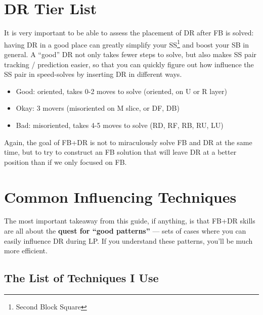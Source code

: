 \documentclass[12pt,letter]{article}
\begin{document}
\section{DR Tier List}\label{drtier}

It is very important to be able to assess the placement of DR after FB is solved: having DR in a good place can greatly simplify your SS\footnote{Second Block Square} and boost your SB in general. A ``good'' DR not only takes fewer steps to solve, but also makes SS pair tracking / prediction easier, so that you can quickly figure out how influence the SS pair in speed-solves by inserting DR in different ways.

\begin{itemize}
    \item Good: oriented, takes 0-2 moves to solve (oriented, on U or R layer)
    \item Okay: 3 movers (misoriented on M slice, or DF, DB)
    \item Bad: misoriented, takes 4-5 moves to solve (RD, RF, RB, RU, LU)
\end{itemize}

Again, the goal of FB+DR is not to miraculously solve FB and DR at the same time, but to try to construct an FB solution that will leave DR at a better position than if we only focused on FB.

\section{Common Influencing Techniques}\label{influencing}

The most important takeaway from this guide, if anything, is that FB+DR skills are all about the \textbf{quest for “good patterns”} --- sets of cases where you can easily influence DR during LP. If you understand these patterns, you'll be much more efficient. 



\subsection{The List of Techniques I Use}
\end{document}

